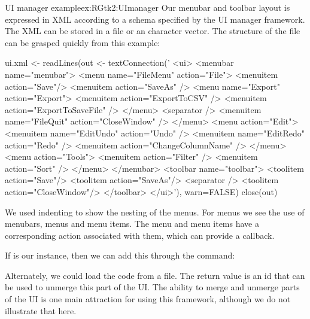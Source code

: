 \begin{example}{UI manager example}{ex:RGtk2:UImanager}
Our menubar and toolbar layout is expressed in XML according to a
schema specified by the UI manager framework. The XML can be stored in
a file or an \R\/ character vector.  The structure of the file can be
grasped quickly from this example:
\begin{Schunk}
\begin{Sinput}
 ui.xml <- readLines(out <- textConnection('
 <ui>
   <menubar name="menubar">
     <menu name="FileMenu" action="File">
       <menuitem action="Save"/>
       <menuitem action="SaveAs" />
       <menu name="Export" action="Export">
         <menuitem action="ExportToCSV" />
         <menuitem action="ExportToSaveFile" />
       </menu>
       <separator />
       <menuitem name="FileQuit" action="CloseWindow" />
     </menu>
     <menu action="Edit">
       <menuitem name="EditUndo" action="Undo" />
       <menuitem name="EditRedo" action="Redo" />
       <menuitem action="ChangeColumnName" />
     </menu>
     <menu action="Tools">
       <menuitem action="Filter" />
       <menuitem action="Sort" />
     </menu>
   </menubar>
   <toolbar name="toolbar">
     <toolitem action="Save"/>
     <toolitem action="SaveAs"/>
     <separator />
     <toolitem action="CloseWindow"/>
   </toolbar>
 </ui>'), warn=FALSE)
 close(out)
\end{Sinput}
\end{Schunk}
%

We used indenting to show the nesting of the menus. For menus we see
the use of menubars, menus and menu items. The menu and menu items have a
corresponding action associated with them, which can provide a callback.

If  is our  instance, then we can
add this through the command:
\begin{Schunk}
\end{Schunk}
Alternately, we could load the code from a file. The return value is
an id that can be used to unmerge this part of the UI. The ability to
merge and unmerge parts of the UI is one main attraction for using
this framework, although we do not illustrate that here. 


\end{example}
